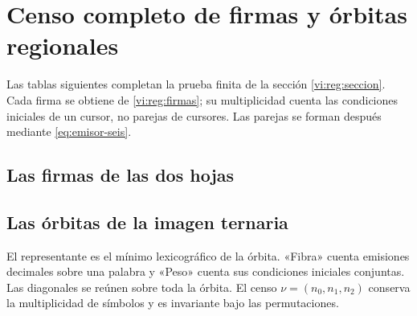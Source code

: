 \section{Censo completo de firmas y órbitas regionales}
\label{vi:reg:tablas}

Las tablas siguientes completan la prueba finita de la sección
\ref{vi:reg:seccion}. Cada firma se obtiene de
\eqref{vi:reg:firmas}; su multiplicidad cuenta las condiciones
iniciales de un cursor, no parejas de cursores. Las parejas se
forman después mediante \eqref{eq:emisor-seis}.

\subsection{Las firmas de las dos hojas}


\subsection{Las órbitas de la imagen ternaria}
El representante es el mínimo lexicográfico de la órbita. «Fibra»
cuenta emisiones decimales sobre una palabra y «Peso» cuenta sus
condiciones iniciales conjuntas. Las diagonales se reúnen sobre
toda la órbita. El censo \(\nu=(n_0,n_1,n_2)\) conserva la
multiplicidad de símbolos y es invariante bajo las permutaciones.

